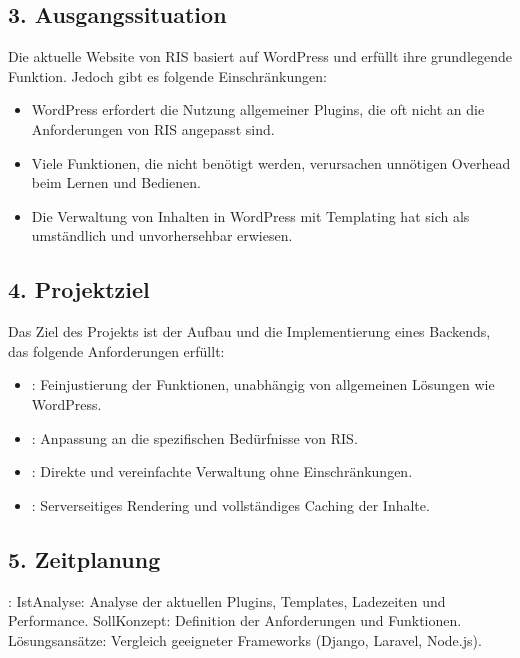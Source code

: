 \documentclass[a4paper,12pt,ngerman]{sphinxmanual}
\begin{document}
\subsection{3. Ausgangssituation}
\label{\detokenize{sections/antrag:ausgangssituation}}
\sphinxAtStartPar
Die aktuelle Website von RIS basiert auf WordPress und erfüllt ihre grundlegende Funktion. Jedoch gibt es folgende Einschränkungen:
\begin{itemize}
\item {} 
\sphinxAtStartPar
WordPress erfordert die Nutzung allgemeiner Plugins, die oft nicht an die Anforderungen von RIS angepasst sind.

\item {} 
\sphinxAtStartPar
Viele Funktionen, die nicht benötigt werden, verursachen unnötigen Overhead beim Lernen und Bedienen.

\item {} 
\sphinxAtStartPar
Die Verwaltung von Inhalten in WordPress mit Templating hat sich als umständlich und unvorhersehbar erwiesen.

\end{itemize}


\subsection{4. Projektziel}
\label{\detokenize{sections/antrag:projektziel}}
\sphinxAtStartPar
Das Ziel des Projekts ist der Aufbau und die Implementierung eines Backends, das folgende Anforderungen erfüllt:
\begin{itemize}
\item {} 
\sphinxAtStartPar
{}: Feinjustierung der Funktionen, unabhängig von allgemeinen Lösungen wie WordPress.

\item {} 
\sphinxAtStartPar
{}: Anpassung an die spezifischen Bedürfnisse von RIS.

\item {} 
\sphinxAtStartPar
{}: Direkte und vereinfachte Verwaltung ohne Einschränkungen.

\item {} 
\sphinxAtStartPar
{}: Server\sphinxhyphen{}seitiges Rendering und vollständiges Caching der Inhalte.

\end{itemize}


\subsection{5. Zeitplanung}
\label{\detokenize{sections/antrag:zeitplanung}}
\sphinxAtStartPar
{}:
\sphinxhyphen{} Ist\sphinxhyphen{}Analyse: Analyse der aktuellen Plugins, Templates, Ladezeiten und Performance.
\sphinxhyphen{} Soll\sphinxhyphen{}Konzept: Definition der Anforderungen und Funktionen.
\sphinxhyphen{} Lösungsansätze: Vergleich geeigneter Frameworks (Django, Laravel, Node.js).
\end{document}
